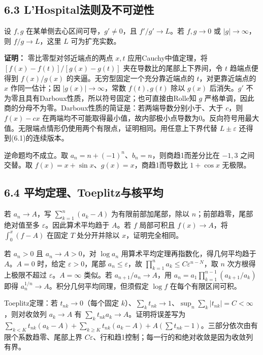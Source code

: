 \documentclass[11pt,a4paper]{article}
\begin{document}
\subsection{6.3
L'Hospital法则及不可逆性}\label{lhospitalux6cd5ux5219ux53caux4e0dux53efux9006ux6027}

设 \(f,g\) 在某单侧去心区间可导，\(g'\ne0\)，且 \(f'/g'\to L\)。若
\(f,g\to0\) 或 \(|g|\to\infty\)，则 \(f/g\to L\)，这里 \(L\)
可为扩充实数。

\textbf{证明：} 零比零型对邻近端点的两点 \(x,t\) 应用Cauchy中值定理，将
\([f(x)-f(t)]/[g(x)-g(t)]\) 夹在导数比的尾部上下界间，令 \(t\)
趋端点便得到 \(f(x)/g(x)\) 的夹逼。无穷型固定一个充分靠近端点的
\(t\)，对更靠近端点的 \(x\) 作同一估计；因 \(|g(x)|\to\infty\)，常数
\(f(t),g(t)\) 除以 \(g(x)\) 后消失。\(g'\)
不为零且具有Darboux性质，所以符号固定；也可直接由Rolle知 \(g\)
严格单调，因此商的分母不为零。Darboux性质的简证是：若两端导数分别小于、大于
\(c\)，则 \(f(x)-cx\)
在两端均不可能取得最小值，故内部极小点导数为0。反向符号用最大值。无限端点情形仍使用两个有限点，证明相同。用任意上下界代替
\(L\pm\varepsilon\) 还得到(6.1)的连续版本。

逆命题均不成立。取 \(a_n=n+(-1)^n\)、\(b_n=n\)，则商趋1而差分比在
\(-1,3\) 之间交替。取 \(f(x)=x+\sin x\)、\(g(x)=x\)，商趋1而导数比
\(1+\cos x\) 无极限。

\subsection{6.4
平均定理、Toeplitz与核平均}\label{ux5e73ux5747ux5b9aux7406toeplitzux4e0eux6838ux5e73ux5747}

若 \(a_n\to A\)，写 \(\sum_{k=1}^n(a_k-A)\) 为有限前部加尾部，除以
\(n\)；前部趋零，尾部绝对值至多 \(\varepsilon\)。因此算术平均趋于
\(A\)。若 \(f\) 局部可积且 \(f(x)\to A\)，将 \(\int_0^x(f-A)\) 在固定
\(T\) 处分开并除以 \(x\)，证明完全相同。

若 \(a_n>0\) 且 \(a_n\to A>0\)，对 \(\log a_n\)
用算术平均定理再指数化，得几何平均趋于 \(A\)。\(A=0\) 时，给定
\(\varepsilon>0\)，尾部 \(a_n\le\varepsilon\)，故
\(\prod_{k=1}^na_k\le C\varepsilon^{n-N}\)，取 \(n\)
次方根得上极限不超过 \(\varepsilon\)。\(A=\infty\) 类似。若
\(a_{n+1}/a_n\to A\)，用 \(a_n=a_1\prod_{k=1}^{n-1}(a_{k+1}/a_k)\) 即得
\(a_n^{1/n}\to A\)。积分几何平均同理，但须假定 \(\log f\)
在每个有限区间可积。

Toeplitz定理：若 \(t_{nk}\to0\)（每个固定
\(k\)）、\(\sum_kt_{nk}\to1\)、\(\sup_n\sum_k|t_{nk}|=C<\infty\)，则对收敛列
\(a_k\to A\) 有 \(\sum_kt_{nk}a_k\to A\)。证明将误差写为
\(\sum_{k<K}t_{nk}(a_k-A)+\sum_{k\ge K}t_{nk}(a_k-A)+A(\sum t_{nk}-1)\)。三部分依次由有限个系数趋零、尾部上界
\(C\varepsilon\)、行和趋1控制；每一行的和绝对收敛是因为收敛列有界。
\end{document}
